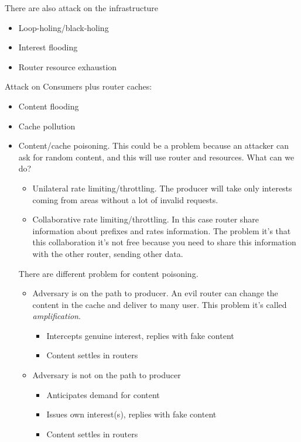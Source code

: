 There are also attack on the infrastructure
\begin{itemize}
  \item Loop-holing/black-holing
  \item Interest flooding
  \item Router resource exhaustion
\end{itemize}

Attack on Consumers plus router caches:
\begin{itemize}
  \item Content flooding
  \item Cache pollution
  \item Content/cache poisoning. This could be a problem because an attacker
can ask for random content, and this will use router and resources. What can
we do?
\begin{itemize}
  \item Unilateral rate limiting/throttling. The producer will take only
interests coming from areas without a lot of invalid requests.
  \item Collaborative rate limiting/throttling. In this case router share
information about prefixes and rates information. The problem it's that this
collaboration it's not free because you need to share this information with the
other router, sending other data.
\end{itemize}
There are different problem for content poisoning.
\begin{itemize}
  \item Adversary is on the path to producer. An evil router can change the
content in the cache and deliver to many user. This problem it's called
\textit{amplification}.
  \begin{itemize}
    \item Intercepts genuine interest, replies with fake content
    \item Content settles in routers
  \end{itemize}
  \item Adversary is not on the path to producer
  \begin{itemize}
    \item Anticipates demand for content
    \item Issues own interest(s), replies with fake content
    \item Content settles in routers
  \end{itemize}
\end{itemize}
\end{itemize}
